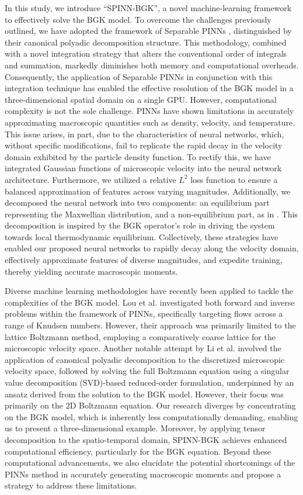 \documentclass[preprint,12pt]{elsarticle}
\begin{document}
In this study, we introduce ``SPINN-BGK'', a novel machine-learning framework to effectively solve the BGK model.
To overcome the challenges previously outlined, we have adopted the framework of Separable PINNs \cite{cho2024separable}, distinguished by their canonical polyadic decomposition structure.
This methodology, combined with a novel integration strategy that alters the conventional order of integrals and summation, markedly diminishes both memory and computational overheads.
Consequently, the application of Separable PINNs in conjunction with this integration technique has enabled the effective resolution of the BGK model in a three-dimensional spatial domain on a single GPU. However, computational complexity is not the sole challenge.
PINNs have shown limitations in accurately approximating macroscopic quantities such as density, velocity, and temperature.
This issue arises, in part, due to the characteristics of neural networks, which, without specific modifications, fail to replicate the rapid decay in the velocity domain exhibited by the particle density function.
To rectify this, we have integrated Gaussian functions of microscopic velocity into the neural network architecture.
Furthermore, we utilized a relative $L^2$ loss function to ensure a balanced approximation of features across varying magnitudes.
Additionally, we decomposed the neural network into two components: an equilibrium part representing the Maxwellian distribution, and a non-equilibrium part, as in \cite{bennoune2008uniformly,jin2010micro}.
This decomposition is inspired by the BGK operator's role in driving the system towards local thermodynamic equilibrium.
Collectively, these strategies have enabled our proposed neural networks to rapidly decay along the velocity domain, effectively approximate features of diverse magnitudes, and expedite training, thereby yielding accurate macroscopic moments.


Diverse machine learning methodologies have recently been applied to tackle the complexities of the BGK model.
Lou et al. \cite{lou2021physics} investigated both forward and inverse problems within the framework of PINNs, specifically targeting flows across a range of Knudsen numbers. However, their approach was primarily limited to the lattice Boltzmann method, employing a comparatively coarse lattice for the microscopic velocity space.
Another notable attempt by Li et al. \cite{li2023solving} involved the application of canonical polyadic decomposition to the discretized microscopic velocity space, followed by solving the full Boltzmann equation using a singular value decomposition (SVD)-based reduced-order formulation, underpinned by an ansatz derived from the solution to the BGK model. However, their focus was primarily on the 2D Boltzmann equation.
Our research diverges by concentrating on the BGK model, which is inherently less computationally demanding, enabling us to present a three-dimensional example.
Moreover, by applying tensor decomposition to the spatio-temporal domain, SPINN-BGK achieves enhanced computational efficiency, particularly for the BGK equation.
Beyond these computational advancements, we also elucidate the potential shortcomings of the PINNs method in accurately generating macroscopic moments and propose a strategy to address these limitations.
\end{document}
